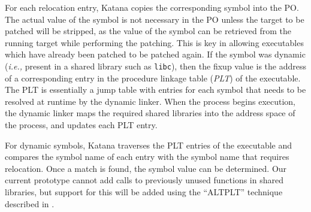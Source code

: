 For each relocation entry, Katana copies the corresponding symbol into
the PO. The actual value of the symbol is not necessary in the PO
unless the target to be patched will be stripped, as the value of the
symbol can be retrieved from the running target while performing the
patching. This is key in allowing executables which have already been
patched to be patched again.
If the symbol was
dynamic ({\it i.e.,} present in a shared library such as {\tt libc}),
then the fixup value is the address of a corresponding entry in the
procedure linkage table ({\it PLT}) of the executable.  The PLT is
essentially a jump table with entries for each symbol that needs to be
resolved at runtime by the dynamic linker.  When the process begins
execution, the dynamic linker maps the required shared libraries into
the address space of the process, and updates each PLT entry.

For dynamic symbols, Katana traverses the PLT entries of the
executable and compares the symbol name of each entry with
the symbol name that requires relocation. Once a match is found, the
symbol value can be determined. Our current prototype cannot add calls
to previously unused functions in shared libraries, but support for
this will be added using the ``ALTPLT'' technique described in \cite{elf-debugging}.


